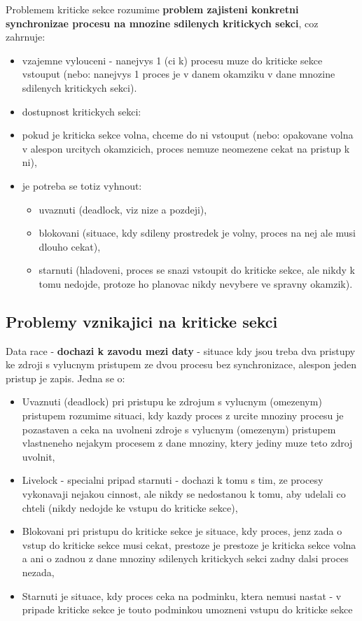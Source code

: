 \documentclass[a4paper, 11pt]{article}
\begin{document}
Problemem kriticke sekce rozumime \textbf{problem zajisteni konkretni synchronizae procesu na mnozine sdilenych kritickych sekci}, coz zahrnuje:
\begin{itemize}
    \item vzajemne vylouceni - nanejvys 1 (ci k) procesu muze do kriticke sekce vstouput (nebo: nanejvys 1 proces je v danem okamziku v dane mnozine sdilenych kritickych sekci).
    \item dostupnost kritickych sekci:
    \item pokud je kriticka sekce volna, chceme do ni vstouput (nebo: opakovane volna v alespon urcitych okamzicich, proces nemuze neomezene cekat na pristup k ni),
    \item je potreba se totiz vyhnout:
    \begin{itemize}
        \item uvaznuti (deadlock, viz nize a pozdeji),
        \item blokovani (situace, kdy sdileny prostredek je volny, proces na nej ale musi dlouho cekat),
        \item starnuti (hladoveni, proces se snazi vstoupit do kriticke sekce, ale nikdy k tomu nedojde, protoze ho planovac nikdy nevybere ve spravny okamzik). \\
    \end{itemize}
\end{itemize}

\newpage

\subsection{Problemy vznikajici na kriticke sekci}
Data race - \textbf{dochazi k zavodu mezi daty} - situace kdy jsou treba dva pristupy ke zdroji s vylucnym pristupem ze dvou procesu bez synchronizace, alespon jeden pristup je zapis. Jedna se o:
\begin{itemize}
    \item Uvaznuti (deadlock) pri pristupu ke zdrojum s vylucnym (omezenym) pristupem rozumime situaci, kdy kazdy proces z urcite mnoziny procesu je pozastaven a ceka na uvolneni zdroje s vylucnym (omezenym) pristupem vlastneneho nejakym procesem z dane mnoziny, ktery jediny muze teto zdroj uvolnit,
    \item Livelock - specialni pripad starnuti - dochazi k tomu s tim, ze procesy vykonavaji nejakou cinnost, ale nikdy se nedostanou k tomu, aby udelali co chteli (nikdy nedojde ke vstupu do kriticke sekce),
    \item Blokovani pri pristupu do kriticke sekce je situace, kdy proces, jenz zada o vstup do kriticke sekce musi cekat, prestoze je prestoze je kriticka sekce volna a ani o zadnou z dane mnoziny sdilenych kritickych sekci zadny dalsi proces nezada,
    \item Starnuti je situace, kdy proces ceka na podminku, ktera nemusi nastat - v pripade kriticke sekce je touto podminkou umozneni vstupu do kriticke sekce \\
\end{itemize}
\end{document}
